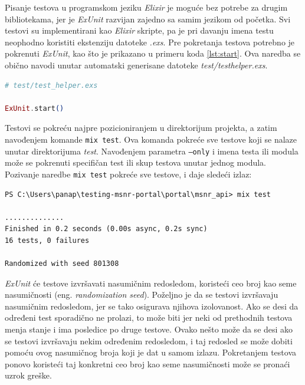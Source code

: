 \documentclass[12pt,oneside]{memoir}
\begin{document}
\par Pisanje testova u programskom jeziku \emph{Elixir} je moguće bez potrebe za drugim bibliotekama, jer je \emph{ExUnit} razvijan zajedno sa samim jezikom od početka. Svi testovi su implementirani kao \emph{Elixir} skripte, pa je pri davanju imena testu neophodno koristiti ekstenziju datoteke \emph{.exs}. Pre pokretanja testova potrebno je pokrenuti \emph{ExUnit}, kao što je prikazano u primeru koda \ref{lst:start}. Ova naredba se obično navodi unutar automatski generisane datoteke \emph{test/test{\textunderscore}helper.exs}.  \\

\begin{minipage}{\linewidth}
\begin{lstlisting}[language=elixir, basicstyle=\small, caption={Pokretanje \emph{ExUnit}},captionpos=b, label={lst:start}]
# test/test_helper.exs

ExUnit.start()
\end{lstlisting}
\end{minipage}

\par Testovi se pokreću najpre pozicioniranjem u direktorijum projekta, a zatim navođenjem komande \texttt{mix test}. Ova komanda pokreće sve testove koji se nalaze unutar direktorijuma \emph{test}. Navođenjem parametra \texttt{---only} i imena testa ili modula može se pokrenuti specifičan test ili skup testova unutar jednog modula. Pozivanje naredbe \texttt{mix test} pokreće sve testove, i daje sledeći izlaz:  

\begin{minipage}{\linewidth}
\begin{lstlisting}[style=DOS]
PS C:\Users\panap\testing-msnr-portal\portal\msnr_api> mix test

..............
Finished in 0.2 seconds (0.00s async, 0.2s sync)
16 tests, 0 failures

Randomized with seed 801308
\end{lstlisting}
\end{minipage}

\par \emph{ExUnit} će testove izvršavati nasumičnim redosledom, koristeći ceo broj kao seme nasumičnosti (eng. \emph{randomization seed}). Poželjno je da se testovi izvršavaju nasumičnim redosledom, jer se tako osigurava njihova izolovanost. Ako se desi da određeni test sporadično ne prolazi, to može biti jer neki od prethodnih testova menja stanje i ima posledice po druge testove. Ovako nešto može da se desi ako se testovi izvršavaju nekim određenim redosledom, i taj redosled se može dobiti pomoću ovog nasumičnog broja koji je dat u samom izlazu. Pokretanjem testova ponovo koristeći taj konkretni ceo broj kao seme nasumičnosti može se pronaći uzrok greške. 
\end{document}
